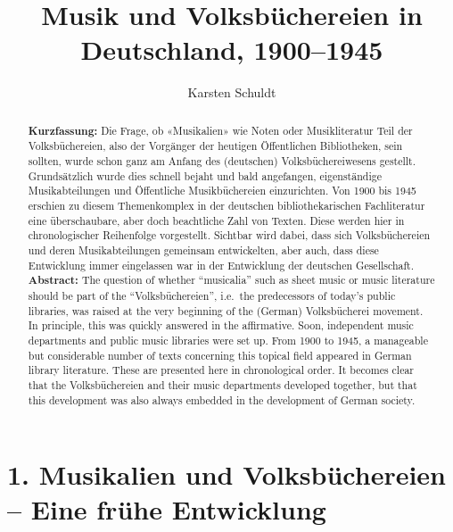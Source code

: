 \documentclass[a4paper,
fontsize=11pt,
oneside,
numbers=noperiodatend,
parskip=half-,
bibliography=totoc,
final
]{scrartcl}
\title{\LARGE{Musik und Volksbüchereien in Deutschland, 1900–1945}}%
\author{Karsten Schuldt} %
\date{}
\begin{document}
\maketitle
\thispagestyle{fancyplain} 

\begin{abstract}
\noindent
\textbf{Kurzfassung:} Die Frage, ob «Musikalien» wie Noten oder
Musikliteratur Teil der Volksbüchereien, also der Vorgänger der heutigen
Öffentlichen Bibliotheken, sein sollten, wurde schon ganz am Anfang des
(deutschen) Volksbüchereiwesens gestellt. Grundsätzlich wurde dies
schnell bejaht und bald angefangen, eigenständige Musikabteilungen und
Öffentliche Musikbüchereien einzurichten. Von 1900 bis 1945 erschien zu
diesem Themenkomplex in der deutschen bibliothekarischen Fachliteratur
eine überschaubare, aber doch beachtliche Zahl von Texten. Diese werden
hier in chronologischer Reihenfolge vorgestellt. Sichtbar wird dabei,
dass sich Volksbüchereien und deren Musikabteilungen gemeinsam
entwickelten, aber auch, dass diese Entwicklung immer eingelassen war in
der Entwicklung der deutschen Gesellschaft. \\

\noindent
\textbf{Abstract:} The question of whether ``musicalia'' such as sheet
music or music literature should be part of the ``Volksbüchereien'',
i.e.~the predecessors of today's public libraries, was raised at the
very beginning of the (German) Volksbücherei movement. In principle,
this was quickly answered in the affirmative. Soon, independent music
departments and public music libraries were set up. From 1900 to 1945, a
manageable but considerable number of texts concerning this topical
field appeared in German library literature. These are presented here in
chronological order. It becomes clear that the Volksbüchereien and their
music departments developed together, but that this development was also
always embedded in the development of German society.
\end{abstract}

\hypertarget{musikalien-und-volksbuxfcchereien-eine-fruxfche-entwicklung}{%
\section{1. Musikalien und Volksbüchereien -- Eine frühe
Entwicklung}\label{musikalien-und-volksbuxfcchereien-eine-fruxfche-entwicklung}}
\end{document}
